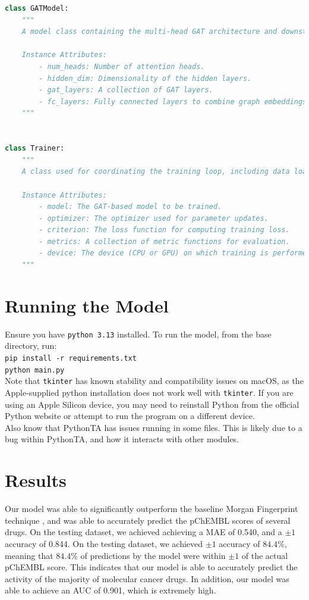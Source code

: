 \documentclass[fontsize=11pt]{article}
\begin{document}
\begin{lstlisting}[language=Python, caption={Scratch implementation of \texttt{GATModel} and \texttt{Trainer} classes}, label={lst:listing2}]
class GATModel:
    """
    A model class containing the multi-head GAT architecture and downstream fully connected layers for final prediction.
    
    Instance Attributes:
        - num_heads: Number of attention heads.
        - hidden_dim: Dimensionality of the hidden layers.
        - gat_layers: A collection of GAT layers.
        - fc_layers: Fully connected layers to combine graph embeddings with protein features for final prediction.
    """


class Trainer:
    """
    A class used for coordinating the training loop, including data loading, backpropagation, and logging.
    
    Instance Attributes:
        - model: The GAT-based model to be trained.
        - optimizer: The optimizer used for parameter updates.
        - criterion: The loss function for computing training loss.
        - metrics: A collection of metric functions for evaluation.
        - device: The device (CPU or GPU) on which training is performed.
    """
\end{lstlisting}
\section*{Running the Model}
Ensure you have \verb|python 3.13| installed. To run the model, from the base directory, run:\\
\verb|pip install -r requirements.txt|\\
\verb|python main.py|\\

Note that \verb|tkinter| has known stability and compatibility issues on macOS, as the Apple-supplied python installation does not work well with \verb|tkinter|. If you are using an Apple Silicon device, you may need to reinstall Python from the official Python website or attempt to run the program on a different device.\\

Also know that PythonTA has issues running in some files. This is likely due to a bug within PythonTA, and how it interacts with other modules. 

\section*{Results}
Our model was able to significantly outperform the baseline Morgan Fingerprint technique \cite{Rogers2010,ChenGuestrin2016}, and was able to accurately predict the pChEMBL scores of several drugs. On the testing dataset, we achieved achieving a MAE of 0.540, and a $\pm1$ accuracy of 0.844. On the testing dataset, we achieved $\pm 1$ accuracy of $84.4\%$, meaning that $84.4\%$ of predictions by the model were within $\pm 1$ of the actual pChEMBL score. This indicates that our model is able to accurately predict the activity of the majority of molecular cancer drugs. In addition, our model was able to achieve an AUC of 0.901, which is extremely high.
\end{document}
